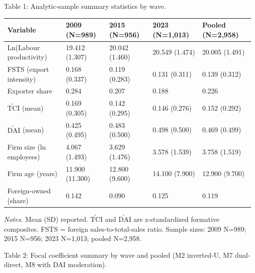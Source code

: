 \documentclass[12pt,a4paper]{article}
\begin{document}
Table 1: Analytic-sample summary statistics by wave.

\begin{longtable}[]{@{}lllll@{}}
\toprule\noalign{}
Variable & 2009 (N=989) & 2015 (N=956) & 2023 (N=1,013) & Pooled
(N=2,958) \\
\midrule\noalign{}
\endhead
\bottomrule\noalign{}
\endlastfoot
Ln(Labour productivity) & 19.412 (1.307) & 20.042 (1.460) & 20.549
(1.474) & 20.005 (1.491) \\
FSTS (export intensity) & 0.168 (0.337) & 0.119 (0.283) & 0.131 (0.311)
& 0.139 (0.312) \\
Exporter share & 0.284 & 0.207 & 0.188 & 0.226 \\
\(\tilde{\mathrm{TCI}}\) (mean) & 0.169 (0.305) & 0.142 (0.295) & 0.146
(0.276) & 0.152 (0.292) \\
\(\tilde{\mathrm{DAI}}\) (mean) & 0.425 (0.495) & 0.483 (0.500) & 0.498
(0.500) & 0.469 (0.499) \\
Firm size (ln employees) & 4.067 (1.493) & 3.629 (1.476) & 3.578 (1.539)
& 3.758 (1.519) \\
Firm age (years) & 11.900 (11.300) & 12.800 (9.600) & 14.100 (7.900) &
12.900 (9.700) \\
Foreign-owned (share) & 0.142 & 0.090 & 0.125 & 0.119 \\
\end{longtable}

\emph{Notes.} Mean (SD) reported. \(\tilde{\mathrm{TCI}}\) and
\(\tilde{\mathrm{DAI}}\) are z-standardized formative composites. FSTS =
foreign sales-to-total-sales ratio. Sample sizes: 2009 N=989; 2015
N=956; 2023 N=1,013; pooled N=2,958.

Table 2: Focal coefficient summary by wave and pooled (M2 inverted-U, M7
dual-direct, M8 with DAI moderation).
\end{document}
